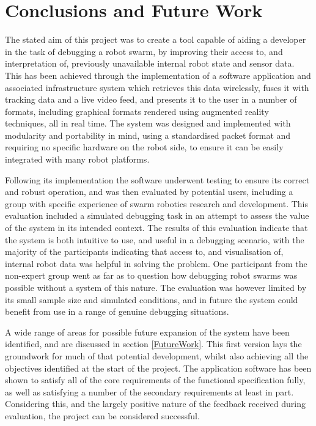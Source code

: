 
\chapter[Conclusions and Future Work]{Conclusions and Future Work} %

\label{ChapterConclusion} %


The stated aim of this project was to create a tool capable of aiding a developer in the task of debugging a robot swarm, by improving their access to, and interpretation of, previously unavailable internal robot state and sensor data. This has been achieved through the implementation of a software application and associated infrastructure system which retrieves this data wirelessly, fuses it with tracking data and a live video feed, and presents it to the user in a number of formats, including graphical formats rendered using augmented reality techniques, all in real time. The system was designed and implemented with modularity and portability in mind, using a standardised packet format and requiring no specific hardware on the robot side, to ensure it can be easily integrated with many robot platforms.

Following its implementation the software underwent testing to ensure its correct and robust operation, and was then evaluated by potential users, including a group with specific experience of swarm robotics research and development. This evaluation included a simulated debugging task in an attempt to assess the value of the system in its intended context. The results of this evaluation indicate that the system is both intuitive to use, and useful in a debugging scenario, with the majority of the participants indicating that access to, and visualisation of, internal robot data was helpful in solving the problem. One participant from the non-expert group went as far as to question how debugging robot swarms was possible without a system of this nature. The evaluation was however limited by its small sample size and simulated conditions, and in future the system could benefit from use in a range of genuine debugging situations.

A wide range of areas for possible future expansion of the system have been identified, and are discussed in section \ref{FutureWork}. This first version lays the groundwork for much of that potential development, whilst also achieving all the objectives identified at the start of the project. The application software has been shown to satisfy all of the core requirements of the functional specification fully, as well as satisfying a number of the secondary requirements at least in part. Considering this, and the largely positive nature of the feedback received during evaluation, the project can be considered successful.

